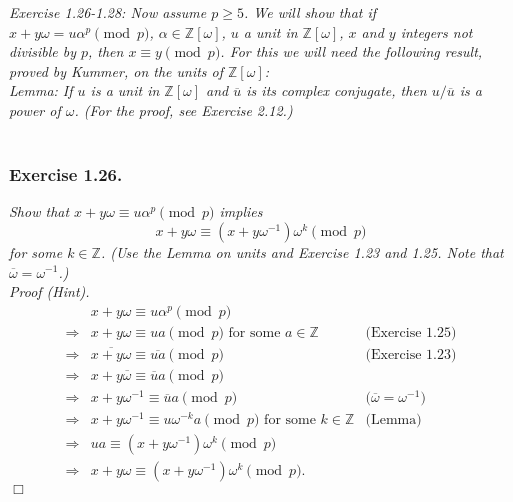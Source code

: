 \documentclass{article}
\begin{document}



\emph{Exercise 1.26-1.28: Now assume $p \geq 5$.
We will show that if $x+y\omega = u\alpha^p \pmod{p}$,
$\alpha \in \mathbb{Z}[\omega]$,
$u$ a unit in $\mathbb{Z}[\omega]$,
$x$ and $y$ integers not divisible by $p$,
then $x \equiv y \pmod{p}$.
For this we will need the following result, proved by Kummer,
on the units of $\mathbb{Z}[\omega]$:} \\

\emph{Lemma: If $u$ is a unit in $\mathbb{Z}[\omega]$ and
$\overline{u}$ is its complex conjugate, then $u/\overline{u}$
is a power of $\omega$.
(For the proof, see Exercise 2.12.)} \\\\






\subsubsection*{Exercise 1.26.}
\emph{Show that $x + y\omega \equiv u \alpha^p \pmod{p}$ implies
$$x + y\omega \equiv (x + y\omega^{-1}) \omega^k \pmod{p}$$
for some $k \in \mathbb{Z}$.
(Use the Lemma on units and Exercise 1.23 and 1.25.
Note that $\overline{\omega} = \omega^{-1}$.) } \\

\emph{Proof (Hint).}
\begin{align*}
&x + y\omega \equiv u \alpha^p \pmod{p} \\
\Longrightarrow&
x + y\omega \equiv ua \pmod{p} \text{ for some } a \in \mathbb{Z}
  &\text{(Exercise 1.25)} \\
\Longrightarrow&
\overline{x + y\omega} \equiv \overline{u a} \pmod{p}
  &\text{(Exercise 1.23)} \\
\Longrightarrow&
x + y\overline{\omega} \equiv \overline{u} a \pmod{p} \\
\Longrightarrow&
x + y \omega^{-1} \equiv \overline{u} a \pmod{p}
  &\text{($\overline{\omega} = \omega^{-1}$)} \\
\Longrightarrow&
x + y \omega^{-1} \equiv u \omega^{-k} a \pmod{p} \text{ for some } k \in \mathbb{Z}
  &\text{(Lemma)} \\
\Longrightarrow&
ua \equiv (x + y \omega^{-1})\omega^{k} \pmod{p} \\
\Longrightarrow&
x + y\omega \equiv (x + y \omega^{-1})\omega^{k} \pmod{p}.
\end{align*}
$\Box$ \\\\
\end{document}
